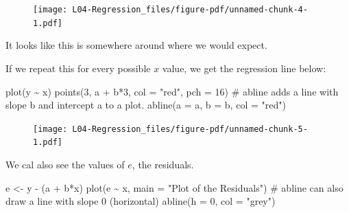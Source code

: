 \documentclass[
  letterpaper,
  DIV=11,
  numbers=noendperiod]{scrreprt}
\newenvironment{Shaded}{\begin{snugshade}}{\end{snugshade}}
\newcommand{\AttributeTok}[1]{\textcolor[rgb]{0.40,0.45,0.13}{#1}}
\newcommand{\CommentTok}[1]{\textcolor[rgb]{0.37,0.37,0.37}{#1}}
\newcommand{\DecValTok}[1]{\textcolor[rgb]{0.68,0.00,0.00}{#1}}
\newcommand{\FunctionTok}[1]{\textcolor[rgb]{0.28,0.35,0.67}{#1}}
\newcommand{\NormalTok}[1]{\textcolor[rgb]{0.00,0.23,0.31}{#1}}
\newcommand{\OtherTok}[1]{\textcolor[rgb]{0.00,0.23,0.31}{#1}}
\newcommand{\SpecialCharTok}[1]{\textcolor[rgb]{0.37,0.37,0.37}{#1}}
\newcommand{\StringTok}[1]{\textcolor[rgb]{0.13,0.47,0.30}{#1}}
\begin{document}
\begin{figure}[H]

{\centering \texttt{[image: L04-Regression\_files/figure-pdf/unnamed-chunk-4-1.pdf]}

}

\end{figure}

It looks like this is somewhere around where we would expect.

If we repeat this for every possible \(x\) value, we get the regression
line below:

\begin{Shaded}
\begin{Highlighting}[]
\FunctionTok{plot}\NormalTok{(y }\SpecialCharTok{\textasciitilde{}}\NormalTok{ x)}
\FunctionTok{points}\NormalTok{(}\DecValTok{3}\NormalTok{, a }\SpecialCharTok{+}\NormalTok{ b}\SpecialCharTok{*}\DecValTok{3}\NormalTok{, }\AttributeTok{col =} \StringTok{"red"}\NormalTok{, }\AttributeTok{pch =} \DecValTok{16}\NormalTok{)}
\CommentTok{\# abline adds a line with slope b and intercept a to a plot.}
\FunctionTok{abline}\NormalTok{(}\AttributeTok{a =}\NormalTok{ a, }\AttributeTok{b =}\NormalTok{ b, }\AttributeTok{col =} \StringTok{"red"}\NormalTok{)}
\end{Highlighting}
\end{Shaded}

\begin{figure}[H]

{\centering \texttt{[image: L04-Regression\_files/figure-pdf/unnamed-chunk-5-1.pdf]}

}

\end{figure}

We cal also see the values of \(e\), the residuals.

\begin{Shaded}
\begin{Highlighting}[]
\NormalTok{e }\OtherTok{\textless{}{-}}\NormalTok{ y }\SpecialCharTok{{-}}\NormalTok{ (a }\SpecialCharTok{+}\NormalTok{ b}\SpecialCharTok{*}\NormalTok{x)}
\FunctionTok{plot}\NormalTok{(e }\SpecialCharTok{\textasciitilde{}}\NormalTok{ x, }\AttributeTok{main =} \StringTok{"Plot of the Residuals"}\NormalTok{)}
\CommentTok{\# abline can also draw a line with slope 0 (horizontal)}
\FunctionTok{abline}\NormalTok{(}\AttributeTok{h =} \DecValTok{0}\NormalTok{, }\AttributeTok{col =} \StringTok{"grey"}\NormalTok{)}
\end{Highlighting}
\end{Shaded}
\end{document}
